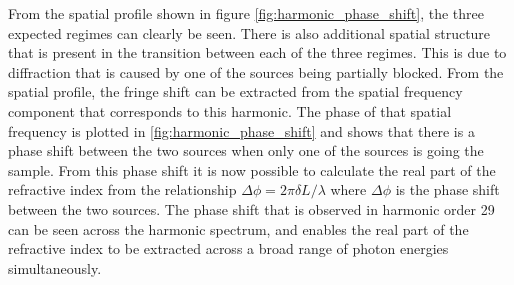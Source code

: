 From the spatial profile shown in figure \ref{fig:harmonic_phase_shift}, the three expected regimes can clearly be seen.  There is also additional spatial structure that is present in the transition between each of the three regimes.  This is due to diffraction that is caused by one of the sources being partially blocked.  From the spatial profile, the fringe shift can be extracted from the spatial frequency component that corresponds to this harmonic.  The phase of that spatial frequency is plotted in \ref{fig:harmonic_phase_shift} and shows that there is a phase shift between the two sources when only one of the sources is going the sample.  From this phase shift it is now possible to calculate the real part of the refractive index from the relationship $\Delta \phi = 2\pi\delta L/\lambda$ where $\Delta \phi$ is the phase shift between the two sources.  The phase shift that is observed in harmonic order 29 can be seen across the harmonic spectrum, and enables the real part of the refractive index to be extracted across a broad range of photon energies simultaneously.

